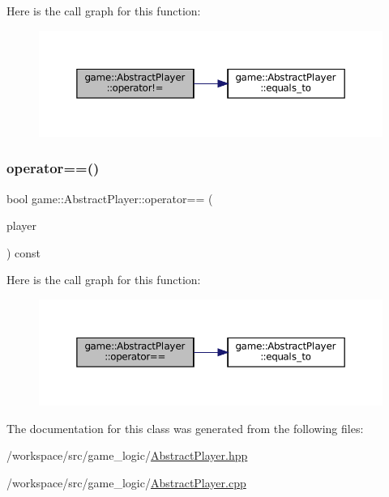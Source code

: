 Here is the call graph for this function\+:
\nopagebreak
\begin{figure}[H]
\begin{center}
\leavevmode
\includegraphics[width=350pt]{classgame_1_1_abstract_player_a3c88c5ef8f89fd74b3e48ff636049c94_cgraph}
\end{center}
\end{figure}
\mbox{\label{classgame_1_1_abstract_player_aaffd1859f7b8b2cd3a00fc47432800e4}} 
\subsubsection{\texorpdfstring{operator==()}{operator==()}}
{\footnotesize\ttfamily bool game\+::\+Abstract\+Player\+::operator== (\begin{DoxyParamCaption}\item[{const \hyperlink{classgame_1_1_abstract_player}{Abstract\+Player} \&}]{player }\end{DoxyParamCaption}) const\hspace{0.3cm}{\ttfamily [inline]}}

Here is the call graph for this function\+:
\nopagebreak
\begin{figure}[H]
\begin{center}
\leavevmode
\includegraphics[width=350pt]{classgame_1_1_abstract_player_aaffd1859f7b8b2cd3a00fc47432800e4_cgraph}
\end{center}
\end{figure}


The documentation for this class was generated from the following files\+:\begin{DoxyCompactItemize}
\item 
/workspace/src/game\+\_\+logic/\hyperlink{_abstract_player_8hpp}{Abstract\+Player.\+hpp}\item 
/workspace/src/game\+\_\+logic/\hyperlink{_abstract_player_8cpp}{Abstract\+Player.\+cpp}\end{DoxyCompactItemize}
